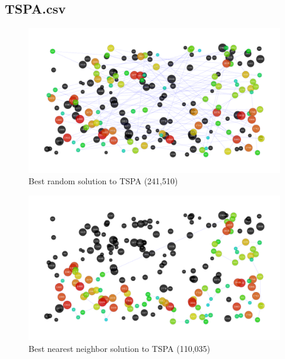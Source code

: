 \documentclass[14pt]{article}
\begin{document}
\subsection{TSPA.csv}
\begin{figure}[H]
	\begin{adjustwidth}{-3em}{0}
		\includegraphics{results/best_random_TSPA.pdf}
	\end{adjustwidth}
	\vspace{-15mm}
	\caption{Best random solution to TSPA (241,510)}
\end{figure}
\begin{figure}[H]
	\begin{adjustwidth}{-3em}{0}
		\includegraphics{results/best_nearest-neighbor_TSPA.pdf}
	\end{adjustwidth}
	\vspace{-15mm}
	\caption{Best nearest neighbor solution to TSPA (110,035)}
\end{figure}
\end{document}

